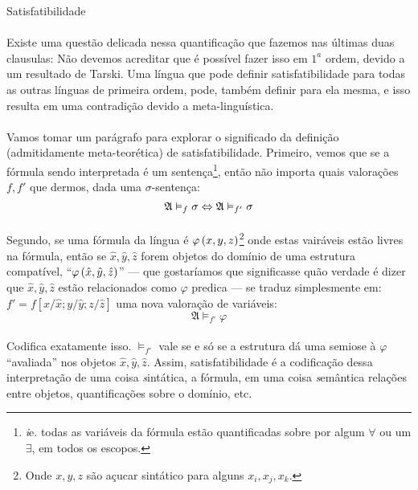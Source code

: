 \begin{definition}{Satisfatibilidade}
            \paragraph{}
                Existe uma questão delicada nessa quantificação
                que fazemos nas últimas duas clausulas: Não devemos
                acreditar que é possível fazer isso em $1^a$ ordem,
                devido a um resultado de Tarski. Uma língua que pode 
                definir satisfatibilidade para todas as outras línguas 
                de primeira ordem, pode, também definir para ela mesma,
                e isso resulta em uma contradição devido a meta-linguística.
        \end{definition}

        \paragraph{}
            Vamos tomar um parágrafo para explorar o significado 
            da definição (admitidamente meta-teorética) de 
            satisfatibilidade. Primeiro, vemos que se a fórmula 
            sendo interpretada é um sentença\footnote{{\emph ie.} 
            todas as variáveis da fórmula estão quantificadas 
            sobre por algum $\forall$ ou um $\exists$, em todos 
            os escopos.}, então não importa quais valorações $f,
            f'$ que dermos, dada uma $\sigma$-sentença:
            $$ \mathfrak{A}\vDash_{f} \sigma \Leftrightarrow \mathfrak{A}\vDash_{f'} \sigma $$
        \paragraph{}
            Segundo, se uma fórmula da língua é $\varphi\POINT{x}{y}{z}$\footnote{
            Onde $x,y,z$ são açucar sintático para alguns $x_i, 
            x_j, x_k$.} onde estas vairáveis estão livres na 
            fórmula, então se $\hat{x}, \hat{y}, \hat{z}$ forem
            objetos do domínio de uma estrutura compatível, 
            ``$\varphi\POINT{\hat{x}}{\hat{y}}{\hat{z}}$'' ---
            que gostaríamos que significasse quão verdade é dizer que
            $\hat{x}, \hat{y}, \hat{z}$ estão relacionados como
            $\varphi$ predica --- se traduz simplesmente em:
            $f'=f[x\slash\hat x; y\slash\hat y; z\slash\hat z]$
            uma nova valoração de variáveis:
            $$ \mathfrak{A}\vDash_{f'} \varphi $$
        \paragraph{}
            Codifica exatamente isso. $\vDash_{f'}$ vale se e só
            se a estrutura dá uma semiose à $\varphi$ ``avaliada''
            nos objetos $\hat{x},\hat{y},\hat{z}$. Assim, 
            satisfatibilidade é a codificação dessa interpretação 
            de uma coisa {\emph sintática}, a fórmula, em uma coisa 
            {\emph semântica} relações entre objetos, quantificações 
            sobre o domínio, etc.
